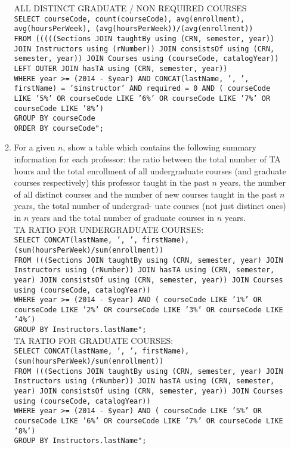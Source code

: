 \begin{enumerate}
\begin{enumerate}
			ALL DISTINCT GRADUATE / NON REQUIRED COURSES\\
        	\texttt{SELECT courseCode, count(courseCode), avg(enrollment), avg(hoursPerWeek), (avg(hoursPerWeek))/(avg(enrollment))\\
					FROM (((((Sections JOIN taughtBy using (CRN, semester, year)) JOIN Instructors using (rNumber)) JOIN consistsOf using (CRN, semester, year)) JOIN Courses using (courseCode, catalogYear)) LEFT OUTER JOIN hasTA using (CRN, semester, year))\\
					WHERE year >= (2014 - \$year) AND CONCAT(lastName, ', ', firstName) = '\$instructor' AND required = 0 AND ( courseCode LIKE '5\%' OR courseCode LIKE '6\%' OR courseCode LIKE '7\%' OR courseCode LIKE '8\%')\\
					GROUP BY courseCode\\
					ORDER BY courseCode";}\\
	
			\item 	For a given $n$, show a table which contains the following summary information for each professor: the ratio between the total number of TA hours and the total enrollment of all undergraduate courses (and graduate courses respectively) this professor taught in the past $n$ years, the number of all distinct courses and the number of new courses taught in the past $n$ years, the total number of undergrad-
uate courses (not just distinct ones) in $n$ years and the total number of graduate courses in $n$ years.\\

					TA RATIO FOR UNDERGRADUATE COURSES:\\
					\texttt{SELECT CONCAT(lastName, ', ', firstName), \\(sum(hoursPerWeek)/sum(enrollment))\\
							FROM (((Sections JOIN taughtBy using (CRN, semester, year) JOIN Instructors using (rNumber)) JOIN hasTA using (CRN, semester, year) JOIN consistsOf using (CRN, semester, year)) JOIN Courses using (courseCode, catalogYear))\\
							WHERE year >= (2014 - \$year) AND ( courseCode LIKE '1\%' OR courseCode LIKE '2\%' OR courseCode LIKE '3\%' OR courseCode LIKE '4\%')\\
							GROUP BY Instructors.lastName";}\\
							
					TA RATIO FOR GRADUATE COURSES:\\
			        \texttt{SELECT CONCAT(lastName, ', ', firstName), \\(sum(hoursPerWeek)/sum(enrollment))\\
						FROM (((Sections JOIN taughtBy using (CRN, semester, year) JOIN Instructors using (rNumber)) JOIN hasTA using (CRN, semester, year) JOIN consistsOf using (CRN, semester, year)) JOIN Courses using (courseCode, catalogYear))\\
						WHERE year >= (2014 - \$year) AND ( courseCode LIKE '5\%' OR courseCode LIKE '6\%' OR courseCode LIKE '7\%' OR courseCode LIKE '8\%')\\
						GROUP BY Instructors.lastName";}\\
					

\end{enumerate}
\end{enumerate}
